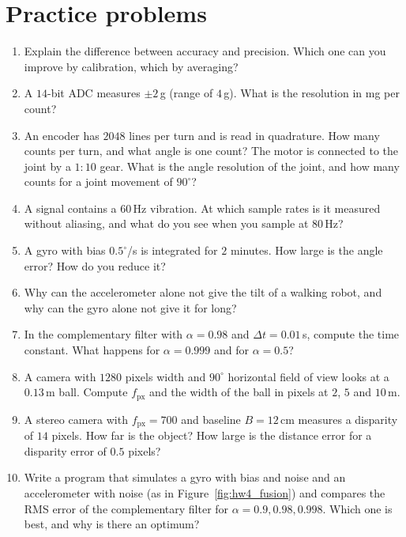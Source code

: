 \section*{Practice problems}
\begin{enumerate}[label=\textbf{\thechapter.\arabic*}]
  \item Explain the difference between accuracy and precision. Which one can you improve by calibration, which by averaging?
  \item A $14$-bit ADC measures $\pm2$\,g (range of $4$\,g). What is the resolution in mg per count?
  \item An encoder has $2048$ lines per turn and is read in quadrature. How many counts per turn, and what angle is one count? The motor is connected to the joint by a $1\!:\!10$ gear. What is the angle resolution of the joint, and how many counts for a joint movement of $90^\circ$?
  \item A signal contains a $60$\,Hz vibration. At which sample rates is it measured without aliasing, and what do you see when you sample at $80$\,Hz?
  \item A gyro with bias $0.5^\circ$/s is integrated for $2$ minutes. How large is the angle error? How do you reduce it?
  \item Why can the accelerometer alone not give the tilt of a walking robot, and why can the gyro alone not give it for long?
  \item In the complementary filter with $\alpha=0.98$ and $\Delta t=0.01$\,s, compute the time constant. What happens for $\alpha=0.999$ and for $\alpha=0.5$?
  \item A camera with $1280$ pixels width and $90^\circ$ horizontal field of view looks at a $0.13$\,m ball. Compute $f_\text{px}$ and the width of the ball in pixels at $2$, $5$ and $10$\,m.
  \item A stereo camera with $f_\text{px}=700$ and baseline $B=12$\,cm measures a disparity of $14$ pixels. How far is the object? How large is the distance error for a disparity error of $0.5$ pixels?
  \item[\textbf{\thechapter.10}$\star$] Write a program that simulates a gyro with bias and noise and an accelerometer with noise (as in Figure~\ref{fig:hw4_fusion}) and compares the RMS error of the complementary filter for $\alpha=0.9,0.98,0.998$. Which one is best, and why is there an optimum?
\end{enumerate}
